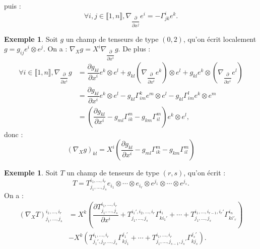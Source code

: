 \documentclass[12pt,a4paper]{article}
\theoremstyle{definition}
\newtheorem{ex}[thm]{Exemple}
\begin{document}
puis :
$$
\forall i,j\in\llbracket 1,n\rrbracket, \nabla_{\dfrac{\partial}{\partial x^j}}e^i=-\Gamma_{jk}^ie^k.
$$
\newpage
\begin{ex}
Soit $g$ un champ de tenseurs de type $(0,2)$, qu'on écrit localement $g=g_{ij}e^i\otimes e^j$. On a : $\nabla_Xg=X^i\nabla_{\dfrac{\partial}{\partial x^i}}g$. De plus :
\begin{align*}
\forall i\in\llbracket 1,n\rrbracket, \nabla_{\dfrac{\partial}{\partial x^i}}g&=\dfrac{\partial g_{kl}}{\partial x^i} e^k\otimes e^l+g_{kl}\left(\nabla_{\dfrac{\partial}{\partial x^i}} e^k\right)\otimes e^l+g_{kl} e^k\otimes\left(\nabla_{\dfrac{\partial}{\partial x^i}} e^l\right)\\&=\dfrac{\partial g_{kl}}{\partial x^i} e^k\otimes e^l-g_{kl}\Gamma_{im}^k e^m\otimes e^l-g_{kl}\Gamma_{im}^l e^k\otimes e^m\\&=\left(\dfrac{\partial g_{kl}}{\partial x^i}-g_{ml}\Gamma_{ik}^m-g_{km}\Gamma_{il}^m\right) e^k\otimes e^l,
\end{align*}
donc :
$$
\left(\nabla_Xg\right)_{kl}=X^i\left(\dfrac{\partial g_{kl}}{\partial x^i}-g_{ml}\Gamma_{ik}^m-g_{km}\Gamma_{il}^m\right)
$$
\end{ex}
\begin{ex}
Soit $T$ un champ de tenseurs de type $(r,s)$, qu'on écrit :
$$
T=T^{i_1,\ldots,i_r}_{j_1,\ldots,j_s}e_{i_1}\otimes\cdots\otimes e_{i_r}\otimes e^{j_1}\otimes\cdots\otimes e^{j_s}.
$$
On a :
\begin{align*}
\left(\nabla_XT\right)^{i_1,\ldots,i_r}_{j_1,\ldots,j_s}&=X^k\left(\dfrac{\partial T_{j_1,\ldots,j_s}^{i_1,\ldots,i_r}}{\partial x^i}+T_{j_1,\ldots,j_s}^{i_1',i_2,\ldots,i_r}\Gamma_{ki_1'}^{i_1}+\cdots+T_{j_1,\ldots,j_s}^{i_1,\ldots,i_{r-1},i_r'}\Gamma_{ki'_r}^{i_n}\right)\\&-X^k\left(T_{j_1',j_2,\ldots,j_s}^{i_1,\ldots,i_r}\Gamma_{kj_1}^{j_1'}+\cdots+T_{j_1,\ldots,j_{s-1},j_s'}^{i_1,\ldots,i_r}\Gamma_{kj_s}^{j_s'}\right).
\end{align*}
\end{ex}
\end{document}

